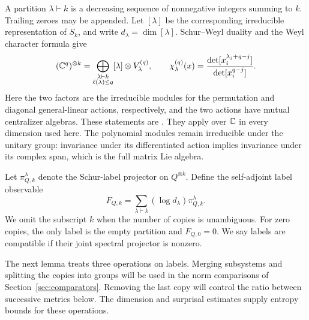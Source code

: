 A partition $\lambda\vdash k$ is a decreasing sequence of nonnegative
integers summing to $k$.  Trailing zeroes may be appended.  Let
$[\lambda]$ be the corresponding irreducible representation of $S_k$,
and write $d_\lambda=\dim[\lambda]$.  Schur--Weyl duality and the Weyl
character formula give
\begin{equation}\label{replicas:schur-decomposition}
 (\mathbb C^q)^{\otimes k}
 =\bigoplus_{\substack{\lambda\vdash k\\\ell(\lambda)\le q}}
       [\lambda]\otimes V^{(q)}_\lambda,
 \qquad
 \chi^{(q)}_\lambda(x)
 =\frac{\det[x_i^{\lambda_j+q-j}]}{\det[x_i^{q-j}]}.
\end{equation}
Here the two factors are the irreducible modules for the permutation
and diagonal general-linear actions, respectively, and the two actions
have mutual centralizer algebras.  These statements are
\cite[Theorem~5.18.4, Corollary~5.19.2, and
Theorem~5.22.1]{EtingofEtAl2011}.  They apply over $\mathbb C$ in every dimension
used here.  The polynomial modules remain irreducible under the unitary
group: invariance under its differentiated action implies invariance
under its complex span, which is the full matrix Lie algebra.

Let $\pi_{Q,k}^{\lambda}$ denote the Schur-label projector on
$Q^{\otimes k}$.  Define the self-adjoint label observable
\begin{equation}\label{replicas:F-definition}
 F_{Q,k}=\sum_{\lambda\vdash k}(\log d_\lambda)\pi_{Q,k}^{\lambda}.
\end{equation}
We omit the subscript $k$ when the number of copies is unambiguous.
For zero copies, the only label is the empty partition and $F_{Q,0}=0$.
We say labels are compatible if their joint spectral projector is
nonzero.

The next lemma treats three operations on labels.  Merging subsystems
and splitting the copies into groups will be used in the norm comparisons
of Section~\ref{sec:comparators}.  Removing the last copy will control the
ratio between successive metrics below.  The dimension and surprisal
estimates supply entropy bounds for these operations.

